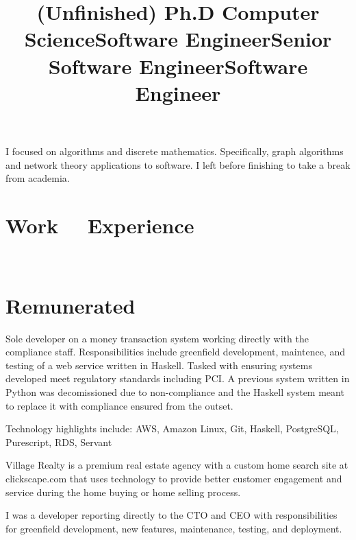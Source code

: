 \documentclass[margintitle,line]{res}
\renewcommand{\subsection}[1]{\section{\normalfont #1}}
\begin{document}
\begin{resume}
\title{(Unfinished) Ph.D Computer Science}
\begin{position}
I focused on algorithms and discrete mathematics. Specifically, graph
algorithms and network theory applications to software. I left before
finishing to take a break from academia.
\end{position}

\section{Work \ \ Experience}
\ \\
\subsection{Remunerated}

\title{Software Engineer}
\begin{position}
\end{position}

\title{Senior Software Engineer}
\begin{position}
  Sole developer on a money transaction system working directly with the
  compliance staff. Responsibilities include greenfield
  development, maintence, and testing of a web service written in Haskell. Tasked
  with ensuring systems developed meet regulatory standards including PCI. A
  previous system written in Python was decomissioned due to non-compliance and
  the Haskell system meant to replace it with compliance ensured from the outset.

  Technology highlights include: AWS, Amazon Linux, Git, Haskell, PostgreSQL,
  Purescript, RDS, Servant
\end{position}

\title{Software Engineer}
\begin{position}
  Village Realty is a premium real estate agency with a custom home search site
  at clickscape.com that uses technology to provide better customer engagement
  and service during the home buying or home selling process.

  I was a developer reporting directly to the CTO and CEO with responsibilities
  for greenfield development, new features, maintenance, testing, and deployment.


\end{position}
\end{resume}
\end{document}
